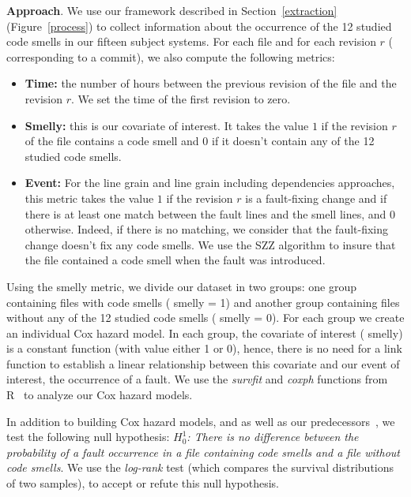 \textbf{Approach}. We use our framework described in Section~\ref{extraction} {\color{blue}(Figure~\ref{process})} to collect information about the occurrence of the 12 studied code smells in our {\color{blue}fifteen} subject systems. %
For each file and for each revision $r$ (\ie{} corresponding to a commit), we also compute the following metrics:
\begin{itemize}
\item \textbf{Time:} the number of hours between the previous revision of the file and the revision $r$. 
We set the time of the first revision to zero.
\item \textbf{Smelly:} this is our covariate of interest. It takes the value $1$ if the revision $r$ of the file contains a code smell and $0$ if it doesn't contain any of the 12 studied code smells. 
\item \textbf{Event:} {\color{blue}For the line grain and line grain including dependencies approaches, this metric takes the value $1$ if the revision $r$ is a fault-fixing change and if there is at least one match between the fault lines and the smell lines, and $0$ otherwise. Indeed, if there is no matching, we consider that the fault-fixing change doesn't fix any code smells.} We use the SZZ algorithm to insure that the file contained a code smell when the fault was introduced.
\end{itemize}

Using the smelly metric, we divide our dataset in two groups: one group containing files with code smells (\ie{} smelly = 1) and another group containing files without any of the 12 studied code smells (\ie{} smelly = 0). For each group we create an individual Cox hazard model. In each group, the covariate of interest (\ie{} smelly) is a constant function (with value either 1 or 0), hence, there is no need for a link function to establish a linear relationship between this covariate and our event of interest, \ie{} the occurrence of a fault. We use the \textsl{survfit} and \textsl{coxph} functions from R~\cite{rPackage} to analyze our Cox hazard models.

In addition to building Cox hazard models, {\color{blue}and as well as our predecessors~\cite{saboury2017empirical}}, we test the following null hypothesis: \emph{$H^{1}_{0}$: There is no difference between the probability of a fault occurrence in a file containing code smells and a file without code smells}. We use the \textsl{log-rank} test (which compares the survival distributions of two samples), to accept or refute this null hypothesis.


